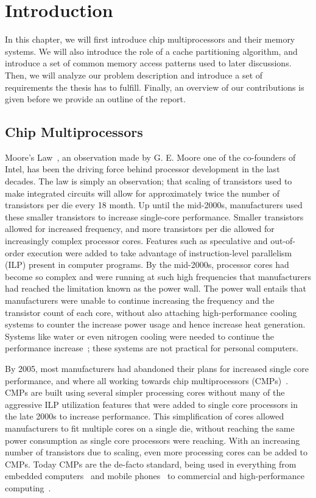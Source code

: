 \chapter{Introduction}
\label{cpt:introduction}

In this chapter, we will first introduce chip multiprocessors and their memory systems.
We will also introduce the role of a cache partitioning algorithm, and introduce a set of common memory access patterns used to later discussions.
Then, we will analyze our problem description and introduce a set of requirements the thesis has to fulfill.
Finally, an overview of our contributions is given before we provide an outline of the report.

\section{Chip Multiprocessors}

Moore's Law~\cite{Moore1998}, an observation made by G. E. Moore one of the co-founders of Intel, has been the driving force behind processor development in the last decades.
The law is simply an observation; that scaling of transistors used to make integrated circuits will allow for approximately twice the number of transistors per die every 18 month.
Up until the mid-2000s, manufacturers used these smaller transistors to increase single-core performance.
Smaller transistors allowed for increased frequency, and more transistors per die allowed for increasingly complex processor cores.
Features such as speculative and out-of-order execution were added to take advantage of instruction-level parallelism (ILP) present in computer programs.
By the mid-2000s, processor cores had become so complex and were running at such high frequencies that manufacturers had reached the limitation known as the power wall.
The power wall entails that manufacturers were unable to continue increasing the frequency and the transistor count of each core, without also attaching high-performance cooling systems to counter the increase power usage and hence increase heat generation.
Systems like water or even nitrogen cooling were needed to continue the performance increase~\cite{Sutter2005}; these systems are not practical for personal computers.

By 2005, most manufacturers had abandoned their plans for increased single core performance, and where all working towards chip multiprocessors (CMPs)~\cite{Sutter2005}.
CMPs are built using several simpler processing cores without many of the aggressive ILP utilization features that were added to single core processors in the late 2000s to increase performance.
This simplification of cores allowed manufacturers to fit multiple cores on a single die, without reaching the same power consumption as single core processors were reaching.
With an increasing number of transistors due to scaling, even more processing cores can be added to CMPs.
Today CMPs are the de-facto standard, being used in everything from embedded computers~\cite{ARM2010} and mobile phones~\cite{Ho2014} to commercial and high-performance computing~\cite{Thomadakis2011, Jain2013}.


